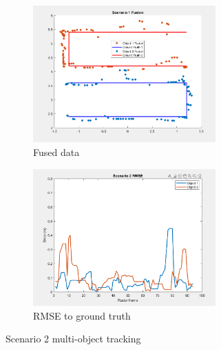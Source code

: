 \begin{figure}[!htb]
    \begin{subfigure}[b]{0.475\textwidth}%
        \includegraphics[width=7cm]{Figures/fusion_scene2.png}
        \caption{Fused data}
        \label{subfig:with_fusion_2}
    \end{subfigure}
    \begin{subfigure}[b]{0.475\textwidth}%
        \includegraphics[width=7cm]{Figures/RMSE2.png}
        \caption{RMSE to ground truth}
        \label{subfig:RMSE_2}
    \end{subfigure}
    \caption{Scenario 2 multi-object tracking}
    \label{fig:scenario_result_2}
\end{figure}

